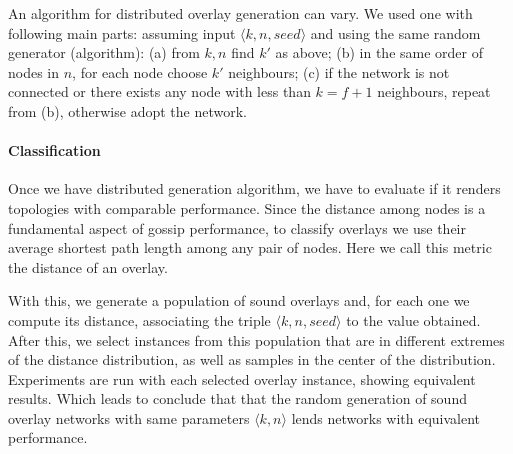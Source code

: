 An algorithm for distributed overlay generation can vary.  We used one with following main parts: assuming input $\langle k, n, seed \rangle$ and using the same random generator (algorithm): (a) from $k,n$ find $k'$
as above; (b) in the same order of nodes in $n$, for each node choose $k'$ neighbours; (c) if the network is not connected or there exists any node with less than $k=f+1$ neighbours, repeat from (b), otherwise adopt the network.

\paragraph{Classification}

Once we have distributed generation algorithm, we have to evaluate if it renders topologies with comparable performance.
Since the distance among nodes is a fundamental aspect of gossip performance,  to classify overlays we use their average shortest path length among any pair of nodes.  Here we call this metric the distance of an overlay.

With this, we generate a population of sound overlays and, for each one we compute its distance, associating the triple $\langle k, n, seed \rangle$ to the value obtained.   After this, we select instances from this population that are in different extremes of the distance distribution, as well as samples in the center of the distribution.  Experiments are run with each selected overlay instance,
%
showing equivalent results. Which leads to conclude that that the random generation of sound overlay networks with same parameters $\langle k, n \rangle$ lends networks with equivalent performance.   





